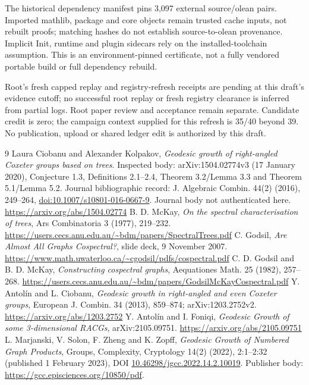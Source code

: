 \documentclass[11pt]{article}
\begin{document}
The historical dependency manifest pins 3,097 external source/olean pairs. Imported mathlib, package and core objects remain trusted cache inputs, not rebuilt proofs; matching hashes do not establish source-to-olean provenance. Implicit Init, runtime and plugin sidecars rely on the installed-toolchain assumption. This is an environment-pinned certificate, not a fully vendored portable build or full dependency rebuild.

Root's fresh capped replay and registry-refresh receipts are pending at this draft's evidence cutoff; no successful root replay or fresh registry clearance is inferred from partial logs. Root paper review and acceptance remain separate. Candidate credit is zero; the campaign context supplied for this refresh is 35/40 beyond 39. No publication, upload or shared ledger edit is authorized by this draft.
\newpage
\begin{thebibliography}{9}
 Laura Ciobanu and Alexander Kolpakov, \emph{Geodesic growth of right-angled Coxeter groups based on trees}. Inspected body: arXiv:1504.02774v3 (17 January 2020), Conjecture 1.3, Definitions 2.1--2.4, Theorem 3.2/Lemma 3.3 and Theorem 5.1/Lemma 5.2. Journal bibliographic record: J. Algebraic Combin. 44(2) (2016), 249--264, \href{https://doi.org/10.1007/s10801-016-0667-9}{doi:10.1007/s10801-016-0667-9}. Journal body not authenticated here. \url{https://arxiv.org/abs/1504.02774}
 B. D. McKay, \emph{On the spectral characterisation of trees}, Ars Combinatoria 3 (1977), 219--232. \url{https://users.cecs.anu.edu.au/~bdm/papers/SpectralTrees.pdf}
 C. Godsil, \emph{Are Almost All Graphs Cospectral?}, slide deck, 9 November 2007. \url{https://www.math.uwaterloo.ca/~cgodsil/pdfs/cospectral.pdf}
 C. D. Godsil and B. D. McKay, \emph{Constructing cospectral graphs}, Aequationes Math. 25 (1982), 257--268. \url{https://users.cecs.anu.edu.au/~bdm/papers/GodsilMcKayCospectral.pdf}
 Y. Antol\'in and L. Ciobanu, \emph{Geodesic growth in right-angled and even Coxeter groups}, European J. Combin. 34 (2013), 859--874; arXiv:1203.2752v2. \url{https://arxiv.org/abs/1203.2752}
 Y. Antol\'in and I. Foniqi, \emph{Geodesic Growth of some 3-dimensional RACGs}, arXiv:2105.09751. \url{https://arxiv.org/abs/2105.09751}
 L. Marjanski, V. Solon, F. Zheng and K. Zopff, \emph{Geodesic Growth of Numbered Graph Products}, Groups, Complexity, Cryptology 14(2) (2022), 2:1--2:32 (published 1 February 2023), DOI \href{https://doi.org/10.46298/jgcc.2022.14.2.10019}{10.46298/jgcc.2022.14.2.10019}. Publisher body: \url{https://gcc.episciences.org/10850/pdf}.
\end{thebibliography}
\end{document}
